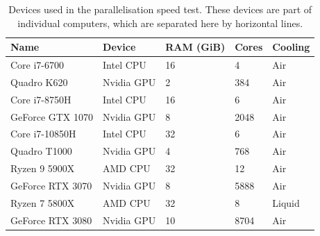 \documentclass{jors}
\begin{document}
		\begin{table}[h!]
			\caption{Devices used in the parallelisation speed test.
			These devices are part of individual computers, which are separated here by horizontal lines.}
			\label{tab:devices}
			\begin{tabular}{l|l|l|l|l}
				\textbf{Name}	&\textbf{Device}&\textbf{RAM (GiB)}	&\textbf{Cores}	&\textbf{Cooling}\\
				\hline
				Core i7-6700	&Intel CPU		&16					&4				&Air\\
				Quadro K620		&Nvidia GPU		&2					&384			&Air\\
				\hline
				Core i7-8750H	&Intel CPU		&16					&6				&Air\\
				GeForce GTX 1070&Nvidia GPU		&8					&2048			&Air\\
				\hline
				Core i7-10850H	&Intel CPU		&32					&6				&Air\\
				Quadro T1000	&Nvidia GPU		&4					&768			&Air\\
				\hline
				Ryzen 9 5900X	&AMD CPU		&32					&12				&Air\\
				GeForce RTX 3070&Nvidia GPU		&8					&5888			&Air\\
				\hline
				Ryzen 7 5800X	&AMD CPU		&32					&8				&Liquid\\
				GeForce RTX 3080&Nvidia GPU		&10					&8704			&Air\\
			\end{tabular}
		\end{table}
\end{document}
